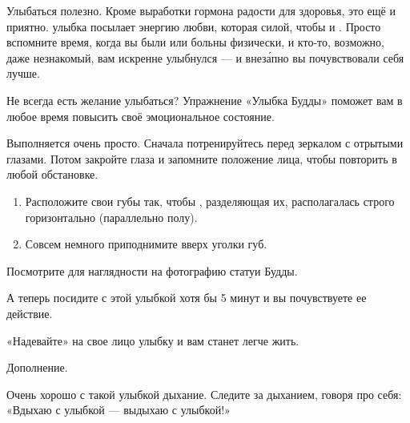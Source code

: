 Улыбаться полезно. Кроме выработки гормона радости для здоровья, это ещё и приятно.
 улыбка посылает энергию любви,
которая  силой, чтобы  и . Просто вспомните время, когда вы были  или больны физически, и кто-то, возможно, даже незнакомый, вам искренне улыбнулся --- и внез\'{а}пно вы почувствовали себя лучше.

Не всегда есть желание улыбаться? Упражнение «Улыбка Будды» поможет вам в любое время повысить своё эмоциональное состояние.

Выполняется очень просто. Сначала потренируйтесь перед зеркалом с отрытыми глазами.
Потом закройте глаза и запомните положение  лица,
чтобы повторить в любой обстановке.

\begin{enumerate}[noitemsep]
    \item Расположите свои губы так, чтобы ,
          разделяющая их, располагалась строго горизонтально (параллельно полу).
    \item Совсем немного приподнимите вверх уголки губ.
\end{enumerate}

Посмотрите для наглядности на фотографию статуи Будды.

А теперь посидите с этой улыбкой хотя бы 5 минут и вы почувствуете ее действие.

«Надевайте» на свое лицо улыбку и вам станет легче жить.

Дополнение.

Очень хорошо с такой улыбкой  дыхание.
Следите за дыханием, говоря про себя: «Вдыхаю с улыбкой --- выдыхаю с улыбкой!»


